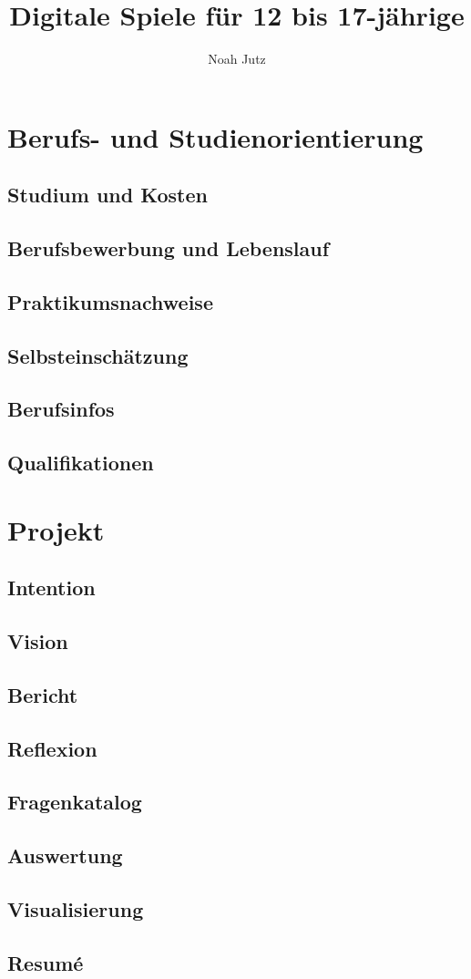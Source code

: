 \documentclass[12pt]{article}
\title{Digitale Spiele für 12 bis 17-jährige}
\author{Noah Jutz}
\date{}
\begin{document}
    \maketitle

    \newpage
    \tableofcontents

    \newpage
    \section{Berufs- und Studienorientierung}
    \subsection{Studium und Kosten}
    
    \subsection{Berufsbewerbung und Lebenslauf}
    \subsection{Praktikumsnachweise}
    \subsection{Selbsteinschätzung}
    \subsection{Berufsinfos}
    \subsection{Qualifikationen}

    \newpage
    \section{Projekt}
    \subsection{Intention}
    \subsection{Vision}
    \subsection{Bericht}
    \subsection{Reflexion}
    \subsection{Fragenkatalog}
    \subsection{Auswertung}
    \subsection{Visualisierung}
    \subsection{Resumé}
\end{document}

